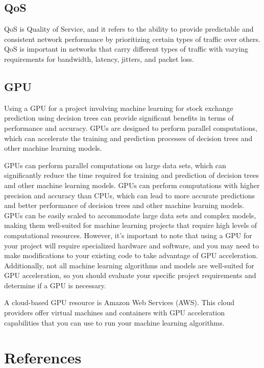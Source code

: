 \documentclass{article}
\begin{document}
\subsection{QoS}
QoS is Quality of Service, and it refers to the ability to provide predictable and consistent network performance by prioritizing certain types of traffic over others. QoS is important in networks that carry different types of traffic with varying requirements for bandwidth, latency, jitters, and packet loss.

\subsection{GPU}
Using a GPU for a project involving machine learning for stock exchange prediction using decision trees can provide significant benefits in terms of performance and accuracy. GPUs are designed to perform parallel computations, which can accelerate the training and prediction processes of decision trees and other machine learning models.

GPUs can perform parallel computations on large data sets, which can significantly reduce the time required for training and prediction of decision trees and other machine learning models.
GPUs can perform computations with higher precision and accuracy than CPUs, which can lead to more accurate predictions and better performance of decision trees and other machine learning models.
GPUs can be easily scaled to accommodate large data sets and complex models, making them well-suited for machine learning projects that require high levels of computational resources.
However, it's important to note that using a GPU for your project will require specialized hardware and software, and you may need to make modifications to your existing code to take advantage of GPU acceleration. Additionally, not all machine learning algorithms and models are well-suited for GPU acceleration, so you should evaluate your specific project requirements and determine if a GPU is necessary.

A cloud-based GPU resource is Amazon Web Services (AWS). This cloud providers offer virtual machines and containers with GPU acceleration capabilities that you can use to run your machine learning algorithms.


\section{References}

\cite{hegazy2014machine}
\end{document}
